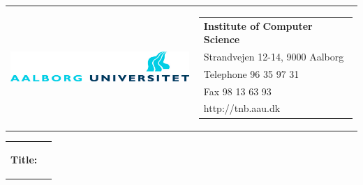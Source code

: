 \thispagestyle{empty}
\begin{titlepage}
    \setlength{\textwidth}{15cm}
    \noindent
    \begin{nopagebreak}
        {\samepage 
            \begin{tabular}{lr}
                \parbox{0.5\textwidth}{\raisebox{11mm}
                    {\includegraphics[height=1.2cm]{Grafik/aauLogoDa}}
                } &
                \parbox{0.5\textwidth}{
                    \small
                    \begin{tabular}{l}
                        {\sf\small \textbf{Institute of Computer Science}}\\
                        {\sf\small Strandvejen 12-14, 9000 Aalborg} \\
                        {\sf\small Telephone 96 35 97 31} \\
                        {\sf\small Fax 98 13 63 93} \\
                        {\sf\small http://tnb.aau.dk}
                    \end{tabular}
                }
            \end{tabular}
            
            \noindent
            \begin{tabular}{cc}
                \parbox{7cm}{
                    \begin{description}
            
                        \item {\bf Title:} 
            

\end{description}}
\end{tabular}}
\end{nopagebreak}
\end{titlepage}
